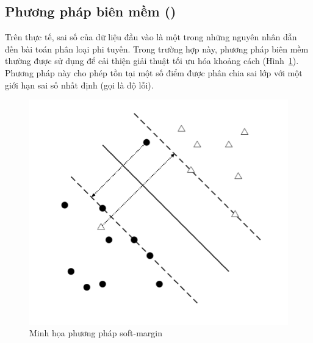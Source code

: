 \subsection*{Phương pháp biên mềm ()}
Trên thực tế, sai số của dữ liệu đầu vào là một trong những nguyên nhân dẫn đến bài toán phân loại phi tuyến. Trong trường hợp này, phương pháp biên mềm thường được sử dụng để cải thiện giải thuật tối ưu hóa khoảng cách (Hình~\ref{fig:softmargin}). Phương pháp này cho phép tồn tại một số điểm được phân chia sai lớp với một giới hạn sai số nhất định (gọi là độ lỗi).
\begin{figure}[h]
\centering
\includegraphics[scale=0.45]{hinh/SVM5.png}
\caption{Minh họa phương pháp soft-margin}
\label{fig:softmargin}
\end{figure}

